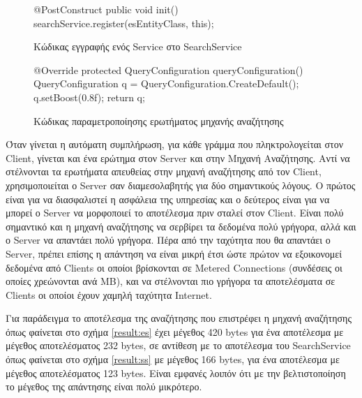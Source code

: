 \begin{figure}[h]
    \begin{javacode}
@PostConstruct
public void init() {
    searchService.register(esEntityClass, this);
}
    \end{javacode}
    \caption{Κώδικας εγγραφής ενός Service στο SearchService}
    \label{code:ssregister}
\end{figure}

\begin{figure}[h]
    \begin{javacode}
@Override
protected QueryConfiguration queryConfiguration() {
    QueryConfiguration q = QueryConfiguration.CreateDefault();
    q.setBoost(0.8f);
    return q;
}
    \end{javacode}
    \caption{Κώδικας παραμετροποίησης ερωτήματος μηχανής αναζήτησης}
    \label{code:ssqueryconfig}
\end{figure}

Όταν γίνεται η αυτόματη συμπλήρωση, για κάθε γράμμα που πληκτρολογείται στον Client, γίνεται και ένα ερώτημα στον Server και στην Μηχανή Αναζήτησης. Αντί να στέλνονται τα ερωτήματα απευθείας στην μηχανή αναζήτησης από τον Client, χρησιμοποιείται ο Server σαν διαμεσολαβητής για δύο σημαντικούς λόγους. Ο πρώτος είναι για να διασφαλιστεί η ασφάλεια της υπηρεσίας και ο δεύτερος είναι για να μπορεί ο Server να μορφοποιεί το αποτέλεσμα πριν σταλεί στον Client. Είναι πολύ σημαντικό και η μηχανή αναζήτησης να σερβίρει τα δεδομένα πολύ γρήγορα, αλλά και ο Server να απαντάει πολύ γρήγορα. Πέρα από την ταχύτητα που θα απαντάει ο Server, πρέπει επίσης η απάντηση να είναι μικρή έτσι ώστε πρώτον να εξοικονομεί δεδομένα από Clients οι οποίοι βρίσκονται σε Metered Connections (συνδέσεις οι οποίες χρεώνονται ανά MB), και να στέλνονται πιο γρήγορα τα αποτελέσματα σε Clients οι οποίοι έχουν χαμηλή ταχύτητα Internet.

Για παράδειγμα το αποτέλεσμα της αναζήτησης που επιστρέφει η μηχανή αναζήτησης όπως φαίνεται στο σχήμα \ref{result:es} έχει μέγεθος 420 bytes για ένα αποτέλεσμα με μέγεθος αποτελέσματος 232 bytes, σε αντίθεση με το αποτέλεσμα του SearchService όπως φαίνεται στο σχήμα \ref{result:ss} με μέγεθος 166 bytes, για ένα αποτέλεσμα με μέγεθος αποτελέσματος 123 bytes. Είναι εμφανές λοιπόν ότι με την βελτιστοποίηση το μέγεθος της απάντησης είναι πολύ μικρότερο.

